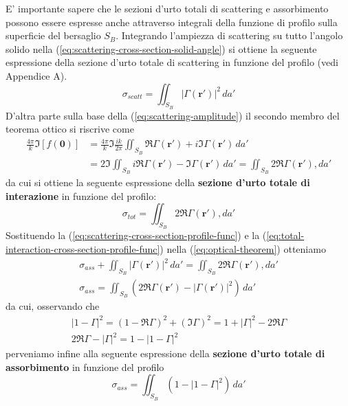 E' importante sapere che le sezioni d'urto totali di scattering e
assorbimento possono essere espresse anche attraverso integrali della
funzione di profilo sulla superficie del bersaglio \(S_B\).
Integrando l'ampiezza di scattering su tutto l'angolo solido nella
(\ref{eq:scattering-cross-section-solid-angle}) si ottiene la seguente espressione della sezione d'urto totale
di scattering in funzione del profilo (vedi Appendice A).
\begin{equation}
	\sigma_{scatt} = \iint_{S_B} |\Gamma(\bm{r}')|^2 \, da'
	\label{eq:scattering-cross-section-profile-func}
\end{equation}
D'altra parte sulla base della (\ref{eq:scattering-amplitude}) il secondo membro del teorema ottico si riscrive come
\begin{align*}
	\frac{4 \pi}{k} \Im[f(\mathbf{0})] &= \frac{4\pi}{k} \Im \frac{ik}{2 \pi} \iint_{S_{B}} \Re \Gamma(\mathbf{r}') +
	i \Im \Gamma(\mathbf{r}') \, da' \\
	& = 2 \Im \iint_{S_{B}} i \Re \Gamma(\mathbf{r}') -  \Im \Gamma(\mathbf{r}') \, da' = \iint_{S_{B}} 2 \Re \Gamma(\mathbf{r}') , da'
\end{align*}
da cui si ottiene la seguente espressione della \textbf{sezione d'urto totale di interazione} in funzione del profilo:
\begin{equation}
	\sigma_{tot} = \iint_{S_{B}} 2 \Re \Gamma(\mathbf{r}') , da'
	\label{eq:total-interaction-cross-section-profile-func}
\end{equation}
Sostituendo la (\ref{eq:scattering-cross-section-profile-func}) e la (\ref{eq:total-interaction-cross-section-profile-func})
nella (\ref{eq:optical-theorem}) otteniamo
\begin{gather*}
    \sigma_{ass} + \iint_{S_B} |\Gamma(\bm{r}')|^2 \, da' = \iint_{S_{B}} 2 \Re \Gamma(\mathbf{r}') , da'\\
    \sigma_{ass} = \iint_{S_{B}} (2 \Re \Gamma(\mathbf{r}') - | \Gamma(\mathbf{r}')|^{2}) \, da'
\end{gather*}
da cui, osservando che
\begin{gather*}
    | 1 - \Gamma|^{2} = (1 - \Re \Gamma)^{2} + (\Im \Gamma)^{2} = 1 + |\Gamma|^{2} - 2 \Re \Gamma\\
    2 \Re \Gamma - | \Gamma |^{2} = 1 - | 1 - \Gamma|^{2}
\end{gather*}
perveniamo infine alla seguente espressione della \textbf{sezione d'urto totale di assorbimento} in funzione del profilo
\begin{equation}
	\sigma_{ass} = \iint_{S_{B}}(1 - | 1 - \Gamma|^{2}) \, da'
	\label{eq:absorption}
\end{equation}
